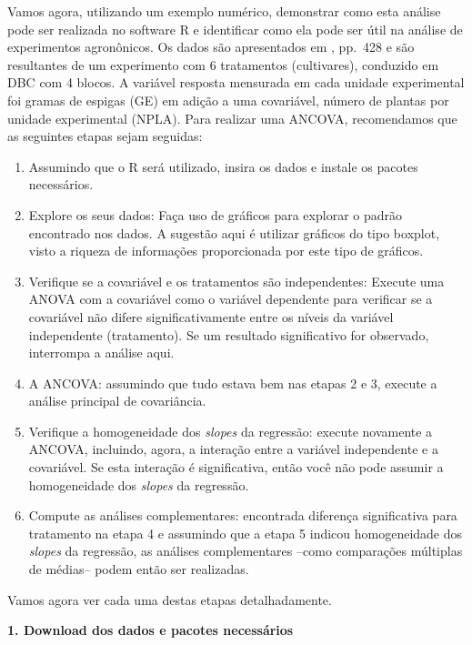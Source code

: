 \documentclass[
]{book}
\begin{document}
Vamos agora, utilizando um exemplo numérico, demonstrar como esta análise pode ser realizada no software R e identificar como ela pode ser útil na análise de experimentos agronônicos. Os dados são apresentados em \citet{Snedecor1967}, pp.~428 e são resultantes de um experimento com 6 tratamentos (cultivares), conduzido em DBC com 4 blocos. A variável resposta mensurada em cada unidade experimental foi gramas de espigas (GE) em adição a uma covariável, número de plantas por unidade experimental (NPLA). Para realizar uma ANCOVA, recomendamos que as seguintes etapas sejam seguidas:

\begin{dica}
\begin{enumerate}
\def\labelenumi{\arabic{enumi}.}
\item
  Assumindo que o R será utilizado, insira os dados e instale os pacotes necessários.
\item
  Explore os seus dados: Faça uso de gráficos para explorar o padrão encontrado nos dados. A sugestão aqui é utilizar gráficos do tipo boxplot, visto a riqueza de informações proporcionada por este tipo de gráficos.
\item
  Verifique se a covariável e os tratamentos são independentes: Execute uma ANOVA com a covariável como o variável dependente para verificar se a covariável não difere significativamente entre os níveis da variável independente (tratamento). Se um resultado significativo for observado, interrompa a análise aqui.
\item
  A ANCOVA: assumindo que tudo estava bem nas etapas 2 e 3, execute a análise principal de covariância.
\item
  Verifique a homogeneidade dos \emph{slopes} da regressão: execute novamente a ANCOVA, incluindo, agora, a interação entre a variável independente e a covariável. Se esta interação é significativa, então você não pode assumir a homogeneidade dos \emph{slopes} da regressão.
\item
  Compute as análises complementares: encontrada diferença significativa para tratamento na etapa 4 e assumindo que a etapa 5 indicou homogeneidade dos \emph{slopes} da regressão, as análises complementares --como comparações múltiplas de médias-- podem então ser realizadas.
\end{enumerate}
\end{dica}

Vamos agora ver cada uma destas etapas detalhadamente.

\textbf{1. Download dos dados e pacotes necessários}
\end{document}
